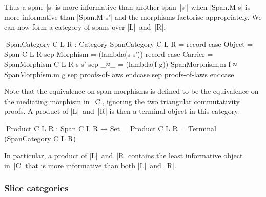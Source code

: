 Thus a span~|s| is more informative than another span~|s'| when |Span.M s| is more informative than |Span.M s'| and the morphisms factorise appropriately.
We can now form a category of spans over |L|~and~|R|:
\begin{code}
^^^SpanCategory C L R : Category
SpanCategory C L R = record
    case  Object    = Span C L R
    sep   Morphism  =
            (lambda(s s')) record
              case   Carrier  = SpanMorphism C L R s s'
              sep    _≈_      = (lambda(f g)) SpanMorphism.m f ≈ SpanMorphism.m g
              sep    proofs-of-laws endcase
    sep   proofs-of-laws endcase
\end{code}
Note that the equivalence on span morphisms is defined to be the equivalence on the mediating morphism in~|C|, ignoring the two triangular commutativity proofs.
A product of |L|~and~|R| is then a terminal object in this category:
\begin{code}
^^^Product C L R : Span C L R → Set _
Product C L R = Terminal (SpanCategory C L R)
\end{code}
In particular, a product of |L|~and~|R| contains the least informative object in~|C| that is more informative than both |L|~and~|R|.

\subsubsection{Slice categories}

